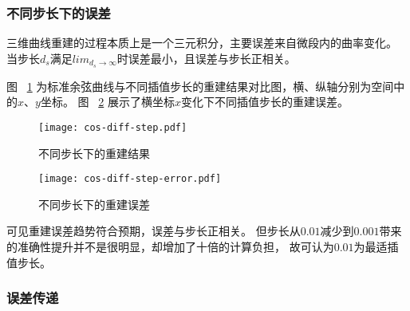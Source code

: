 \subsubsection{不同步长下的误差}

三维曲线重建的过程本质上是一个三元积分，主要误差来自微段内的曲率变化。
当步长$d_s$满足$lim_{d_s \rightarrow \infty}$时误差最小，且误差与步长正相关。


图 ~\ref{fig:cos-diff-step} 为标准余弦曲线与不同插值步长的重建结果对比图，横、纵轴分别为空间中的$x$、$y$坐标。
图 ~\ref{fig:cos-diff-step-error} 展示了横坐标$x$变化下不同插值步长的重建误差。

\begin{figure}[H]
\centering
\texttt{[image: cos-diff-step.pdf]}
\caption{不同步长下的重建结果}
\label{fig:cos-diff-step}
\end{figure}

\begin{figure}[H]
\centering
\texttt{[image: cos-diff-step-error.pdf]}
\caption{不同步长下的重建误差}
\label{fig:cos-diff-step-error}
\end{figure}

可见重建误差趋势符合预期，误差与步长正相关。
但步长从$0.01$减少到$0.001$带来的准确性提升并不是很明显，却增加了十倍的计算负担，
故可认为$0.01$为最适插值步长。

\subsubsection{误差传递}

